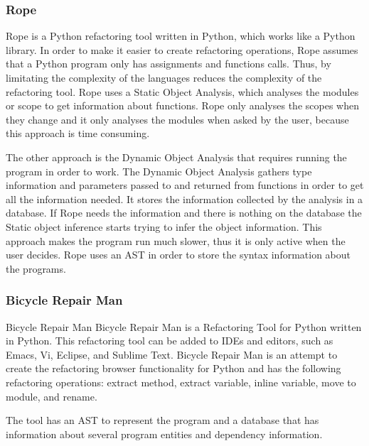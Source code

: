   \subsubsection{Rope}
  Rope is a Python refactoring tool written in Python, which works like a Python library.
  In order to make it easier to create refactoring operations, Rope assumes that a
  Python program only has assignments and functions calls. %
  Thus, by limitating the complexity of the languages reduces the complexity of the
  refactoring tool.
  Rope uses a Static Object Analysis, which analyses the modules or scope to get
  information about functions.
  Rope only analyses the scopes when they change and it only analyses the modules
  when asked by the user, because this approach is time consuming.

  The other approach is the Dynamic Object Analysis that requires running
  the program in order to work.
  The Dynamic Object Analysis gathers type information and parameters passed to and returned from
  functions in order to get all the information needed.
  It stores the information collected by the analysis in a database.
  If Rope needs the information and there is nothing on the database the Static
  object inference starts trying to infer the object information.
  This approach makes the program run much slower, thus it is only active when
  the user decides.%
  Rope uses an AST in order to store the syntax information about the programs.

  \subsubsection{Bicycle Repair Man}
  Bicycle Repair Man
  Bicycle Repair Man is a Refactoring Tool for Python written in Python.
   This refactoring tool can be added to IDEs and editors, such as Emacs, Vi, Eclipse,
    and Sublime Text.
  Bicycle Repair Man is an attempt to create the refactoring browser functionality for
   Python and has the following refactoring operations:
   extract method, extract variable, inline variable, move to module, and rename.

  The tool has an AST to represent the program and a database that has information
  about several program entities and dependency information.
